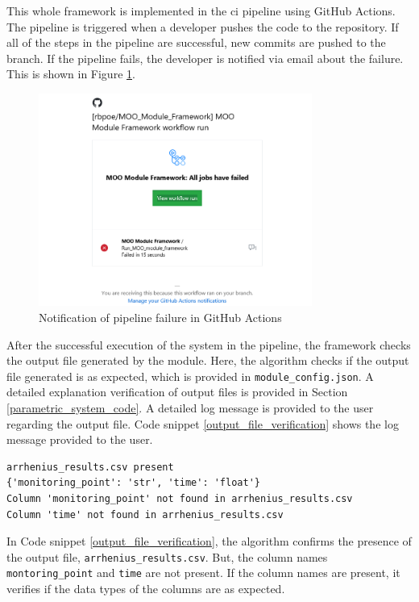 This whole framework is implemented in the \acrshort{ci} pipeline using GitHub Actions. The pipeline is triggered when a developer pushes the code to the 
repository. If all of the steps in the pipeline are successful, new commits are pushed to the branch. If the pipeline fails, the developer is notified via email 
about the failure. This is shown in Figure \ref{github_actions_notification}.
\begin{figure}[!ht]
    \centering
    \includegraphics[width=0.8\textwidth]{Images/github_actions_notification.png}
    \caption{Notification of pipeline failure in GitHub Actions}
    \label{github_actions_notification}
\end{figure}

After the successful execution of the system in the pipeline, the framework checks the output file generated by the module. Here, the algorithm checks if the
output file generated is as expected, which is provided in \texttt{module\_config.json}. A detailed explanation verification of output files is provided in 
Section \ref{parametric_system_code}. A detailed log message is provided to the user regarding the output file. Code snippet \ref{output_file_verification} shows the log message provided 
to the user. 
\renewcommand{\lstlistingname}{Code}
\begin{lstlisting}[style=terminal, caption={Log message for output file verification}, label={output_file_verification}]
arrhenius_results.csv present
{'monitoring_point': 'str', 'time': 'float'}
Column 'monitoring_point' not found in arrhenius_results.csv
Column 'time' not found in arrhenius_results.csv
\end{lstlisting}
In Code snippet \ref{output_file_verification}, the algorithm confirms the presence of the output file, \texttt{arrhenius\_results.csv}. But, the column names
\texttt{montoring\_point} and \texttt{time} are not present. If the column names are present, it verifies if the data types of the columns are as expected.

